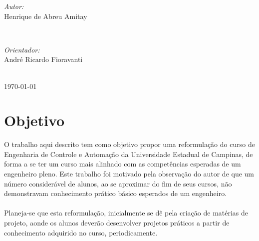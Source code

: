 \documentclass[12pt]{article} %
\begin{document}
\begin{titlepage}
\begin{minipage}{0.4\textwidth}
\begin{flushleft} \large
\emph{Autor:}\\
Henrique de Abreu {Amitay} %
\end{flushleft}
\end{minipage}
~
\begin{minipage}{0.4\textwidth}
\begin{flushleft} \large
\emph{Orientador:} \\
André Ricardo Fioravanti %
\end{flushleft}
\end{minipage}\\[4cm]

{\today}\\[3cm] %


\vfill %

\end{titlepage}



\section{Objetivo} %

O trabalho aqui descrito tem como objetivo propor uma reformulação do curso de Engenharia de Controle e Automação da Universidade Estadual de Campinas, de forma a se ter um curso mais alinhado com as competências esperadas de um engenheiro pleno. Este trabalho foi motivado pela observação do autor de que um número considerável de alunos, ao se aproximar do fim de seus cursos, não demonstravam conhecimento prático básico esperados de um engenheiro.
	\paragraph{}Planeja-se que esta reformulação, inicialmente se dê pela criação de matérias de projeto, aonde os alunos deverão desenvolver projetos práticos a partir de conhecimento adquirido no curso, periodicamente.
\end{document}
